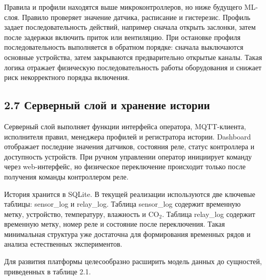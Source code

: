 \documentclass[a4paper,14pt]{extarticle}
\renewcommand{\texttt}[1]{\textnormal{#1}}
\begin{document}
Правила и профили находятся выше микроконтроллеров, но ниже будущего
ML-слоя. Правило проверяет значение датчика, расписание и гистерезис.
Профиль задает последовательность действий, например сначала открыть
заслонки, затем после задержки включить приток или вентиляцию. При
остановке профиля последовательность выполняется в обратном порядке:
сначала выключаются основные устройства, затем закрываются
предварительно открытые каналы. Такая логика отражает физическую
последовательность работы оборудования и снижает риск некорректного
порядка включения.

\hypertarget{ux441ux435ux440ux432ux435ux440ux43dux44bux439-ux441ux43bux43eux439-ux438-ux445ux440ux430ux43dux435ux43dux438ux435-ux438ux441ux442ux43eux440ux438ux438}{%
\subsection{2.7 Серверный слой и хранение
истории}\label{ux441ux435ux440ux432ux435ux440ux43dux44bux439-ux441ux43bux43eux439-ux438-ux445ux440ux430ux43dux435ux43dux438ux435-ux438ux441ux442ux43eux440ux438ux438}}

Серверный слой выполняет функции интерфейса оператора, MQTT-клиента,
исполнителя правил, менеджера профилей и регистратора истории. Dashboard
отображает последние значения датчиков, состояния реле, статус
контроллера и доступность устройств. При ручном управлении оператор
инициирует команду через web-интерфейс, но физическое переключение
происходит только после получения команды контроллером реле.

История хранится в SQLite. В текущей реализации используются две
ключевые таблицы: \texttt{sensor\_log} и \texttt{relay\_log}. Таблица
\texttt{sensor\_log} содержит временную метку, устройство, температуру,
влажность и CO\(_2\). Таблица \texttt{relay\_log} содержит временную
метку, номер реле и состояние после переключения. Такая минимальная
структура уже достаточна для формирования временных рядов и анализа
естественных экспериментов.

Для развития платформы целесообразно расширить модель данных до
сущностей, приведенных в таблице 2.1.
\end{document}
